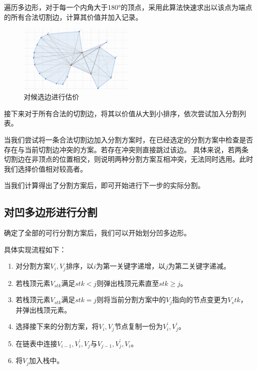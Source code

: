 遍历多边形，对于每一个内角大于180°的顶点，采用此算法快速求出以该点为端点的所有合法切割边，计算其价值并加入记录。

\begin{figure}[htp]
    \centering
    \includegraphics[width=0.5\textwidth]
    {figures/pass1.png}
    \caption{对候选边进行估价}
    \label{pass1}
\end{figure}

接下来对于所有合法的切割边，将其以价值从大到小排序，依次尝试加入分割列表。

当我们尝试将一条合法切割边加入分割方案时，在已经选定的分割方案中检查是否存在与当前切割边冲突的方案。若存在冲突则直接跳过该边。
具体来说，若两条切割边在非顶点的位置相交，则说明两种分割方案互相冲突，无法同时选用。此时我们选择价值相对较高者。

当我们计算得出了分割方案后，即可开始进行下一步的实际分割。

\subsection{对凹多边形进行分割}

确定了全部的可行分割方案后，我们可以开始划分凹多边形。

具体实现流程如下：
\begin{enumerate}
    \item 对分割方案\(V_i,V_j\)排序，以\(i\)为第一关键字递增，以\(j\)为第二关键字递减。
    \item 若栈顶元素\(V_{stk}\)满足\(stk<j\)则弹出栈顶元素直至\(stk\ge j\)。
    \item 若栈顶元素\(V_{stk}\)满足\(stk=j\)则将当前分割方案中的\(V_j\)指向的节点变更为\(V_stk\)，并弹出栈顶元素。
    \item 选择接下来的分割方案，将\(V_i,V_j\)节点复制一份为\(V_{i}^{'},V_{j}^{'}\)。
    \item 在链表中连接\(V_{i-1},V_i^{'},V_j\)与\(V_{j-1},V_j^{'},V_i\)。
    \item 将\(V_j\)加入栈中。
\end{enumerate}

